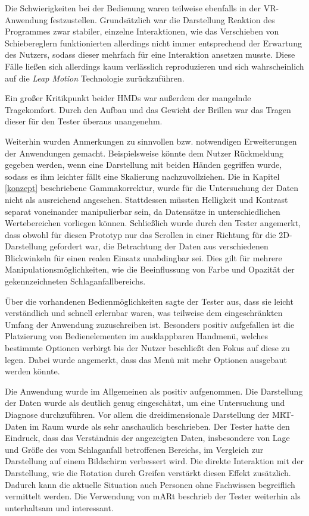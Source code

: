 Die Schwierigkeiten bei der Bedienung waren teilweise ebenfalls in der VR-Anwendung festzustellen. Grundsätzlich war die Darstellung Reaktion des Programmes zwar stabiler, einzelne Interaktionen, wie das Verschieben von Schiebereglern funktionierten allerdings nicht immer entsprechend der Erwartung des Nutzers, sodass dieser mehrfach für eine Interaktion ansetzen musste. 
Diese Fälle ließen sich allerdings kaum verlässlich reproduzieren und sich wahrscheinlich auf die \textit{Leap Motion} Technologie zurückzuführen.

Ein großer Kritikpunkt beider HMDs war außerdem der mangelnde Tragekomfort. Durch den Aufbau und das Gewicht der Brillen war das Tragen dieser für den Tester überaus unangenehm. 

Weiterhin wurden Anmerkungen zu sinnvollen bzw. notwendigen Erweiterungen der Anwendungen gemacht.
Beispielsweise könnte dem Nutzer Rückmeldung gegeben werden, wenn eine Darstellung mit beiden Händen gegriffen wurde, sodass es ihm leichter fällt eine Skalierung nachzuvollziehen.
Die in Kapitel \ref{konzept} beschriebene Gammakorrektur, wurde für die Untersuchung der Daten nicht als ausreichend angesehen. Stattdessen müssten Helligkeit und Kontrast separat voneinander manipulierbar sein, da Datensätze in unterschiedlichen Wertebereichen vorliegen können. 
Schließlich wurde durch den Tester angemerkt, dass obwohl für diesen Prototyp nur das Scrollen in einer Richtung für die 2D-Darstellung gefordert war, die Betrachtung der Daten aus verschiedenen Blickwinkeln für einen realen Einsatz unabdingbar sei. Dies gilt für mehrere Manipulationsmöglichkeiten, wie die Beeinflussung von Farbe und Opazität der gekennzeichneten Schlaganfallbereichs.

Über die vorhandenen Bedienmöglichkeiten sagte der Tester aus, dass sie leicht verständlich und schnell erlernbar waren, was teilweise dem eingeschränkten Umfang der Anwendung zuzuschreiben ist.
Besonders positiv aufgefallen ist die Platzierung von Bedienelementen im ausklappbaren Handmenü, welches bestimmte Optionen verbirgt bis der Nutzer beschließt den Fokus auf diese zu legen. Dabei wurde angemerkt, dass das Menü mit mehr Optionen ausgebaut werden könnte. 

Die Anwendung wurde im Allgemeinen als positiv aufgenommen. 
Die Darstellung der Daten wurde als deutlich genug eingeschätzt, um eine Untersuchung und Diagnose durchzuführen. 
Vor allem die dreidimensionale Darstellung der MRT-Daten im Raum wurde als sehr anschaulich beschrieben. Der Tester hatte den Eindruck, dass das Verständnis der angezeigten Daten, insbesondere von Lage und Größe des vom Schlaganfall betroffenen Bereichs, im Vergleich zur Darstellung auf einem Bildschirm verbessert wird. Die direkte Interaktion mit der Darstellung, wie die Rotation durch Greifen verstärkt diesen Effekt zusätzlich. Dadurch kann die aktuelle Situation auch Personen ohne Fachwissen begreiflich vermittelt werden. 
Die Verwendung von mARt beschrieb der Tester weiterhin als unterhaltsam und interessant.


